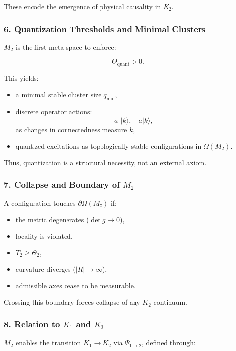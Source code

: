 These encode the emergence of physical causality in $K_2$.

\subsubsection*{6. Quantization Thresholds and Minimal Clusters}

$M_2$ is the first meta-space to enforce:

\[
\Theta_{\text{quant}} > 0.
\]

This yields:

\begin{itemize}
    \item a minimal stable cluster size $q_{\min}$,
    \item discrete operator actions:
    \[
    a^\dagger |k\rangle,\quad a |k\rangle,
    \]
    as changes in connectedness measure $k$,
    \item quantized excitations as topologically stable configurations in $\Omega(M_2)$.
\end{itemize}

Thus, quantization is a structural necessity, not an external axiom.

\subsubsection*{7. Collapse and Boundary of \texorpdfstring{$M_2$}{M_2}}

A configuration touches $\partial\Omega(M_2)$ if:

\begin{itemize}
    \item the metric degenerates ($\det g \to 0$),
    \item locality is violated,
    \item $T_2 \ge \Theta_2$,
    \item curvature diverges ($|R| \to \infty$),
    \item admissible axes cease to be measurable.
\end{itemize}

Crossing this boundary forces collapse of any $K_2$ continuum.

\subsubsection*{8. Relation to \texorpdfstring{$K_1$}{K_1} and \texorpdfstring{$K_3$}{K_3}}

$M_2$ enables the transition $K_1 \to K_2$ via $\Psi_{1\to2}$, defined through:


